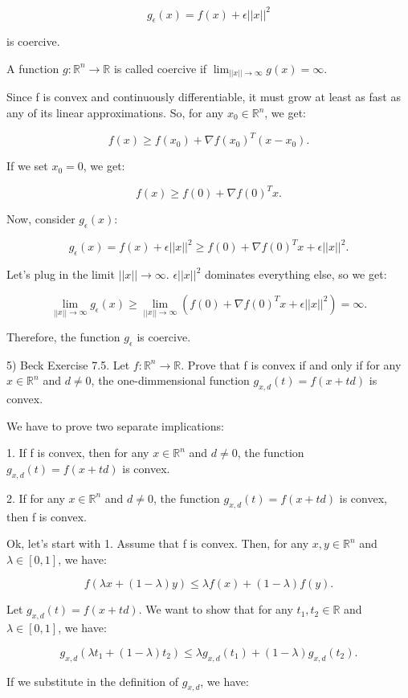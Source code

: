 \documentclass{article}
\newcommand{\RR}{\mathbb{R}}
\begin{document}
\[g_{\epsilon}(x) = f(x) + \epsilon ||x||^2\] 

is coercive.

A function $g : \RR^n \to \RR$ is called coercive if $\lim_{||x|| \to \infty} g(x) = \infty.$

Since f is convex and continuously differentiable, it must grow
at least as fast as any of its linear approximations.
So, for any $x_0 \in \RR^n$, we get:

\[f(x) \geq f(x_0) + \nabla f(x_0)^T (x - x_0).\]

If we set $x_0 = 0$, we get:

\[f(x) \geq f(0) + \nabla f(0)^T x.\]

Now, consider $g_{\epsilon}(x)$:

\[g_{\epsilon}(x) = f(x) + \epsilon ||x||^2 \geq f(0) + \nabla f(0)^T x + \epsilon ||x||^2.\]

Let's plug in the limit $||x|| \to \infty$. $\epsilon ||x||^2$ dominates everything else,
so we get:

\[\lim_{||x|| \to \infty} g_{\epsilon}(x) \geq \lim_{||x|| \to \infty} (f(0) + \nabla f(0)^T x + \epsilon ||x||^2) = \infty.\]

Therefore, the function $g_{\epsilon}$ is coercive.


5) Beck Exercise 7.5. Let $f : \RR^n \to \RR$. Prove that f is convex if and only if
for any $x \in \RR^n$ and $d \neq 0$, the one-dimmensional function
$g_{x,d}(t) = f(x + td)$ is convex.

We have to prove two separate implications:

1. If f is convex, then for any $x \in \RR^n$ and $d \neq 0$,
the function $g_{x,d}(t) = f(x + td)$ is convex.

2. If for any $x \in \RR^n$ and $d \neq 0$, the function $g_{x,d}(t) = f(x + td)$ is convex,
then f is convex.


Ok, let's start with 1. Assume that f is convex. Then, for any $x, y \in \RR^n$
and $\lambda \in [0, 1]$, we have:

\[f(\lambda x + (1 - \lambda) y) \leq \lambda f(x) + (1 - \lambda) f(y).\]

Let $g_{x,d}(t) = f(x + td)$. We want to show that for any $t_1, t_2 \in \RR$
and $\lambda \in [0, 1]$, we have:

\[g_{x,d}(\lambda t_1 + (1 - \lambda) t_2) \leq \lambda g_{x,d}(t_1) + (1 - \lambda)g_{x,d}(t_2).\]

If we substitute in the definition of $g_{x,d}$, we have:
\end{document}
